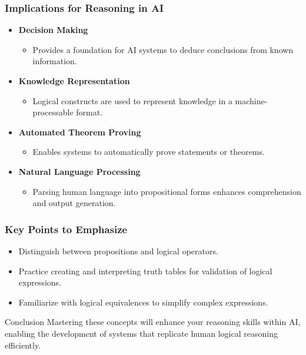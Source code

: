 \documentclass[aspectratio=169]{beamer}
\begin{document}
\begin{frame}[fragile]
    \frametitle{Implications for Reasoning in AI}
    \begin{itemize}
        \item \textbf{Decision Making}
            \begin{itemize}
                \item Provides a foundation for AI systems to deduce conclusions from known information.
            \end{itemize}

        \item \textbf{Knowledge Representation}
            \begin{itemize}
                \item Logical constructs are used to represent knowledge in a machine-processable format.
            \end{itemize}

        \item \textbf{Automated Theorem Proving}
            \begin{itemize}
                \item Enables systems to automatically prove statements or theorems.
            \end{itemize}

        \item \textbf{Natural Language Processing}
            \begin{itemize}
                \item Parsing human language into propositional forms enhances comprehension and output generation.
            \end{itemize}
    \end{itemize}
\end{frame}

\begin{frame}[fragile]
    \frametitle{Key Points to Emphasize}
    \begin{itemize}
        \item Distinguish between propositions and logical operators.
        \item Practice creating and interpreting truth tables for validation of logical expressions.
        \item Familiarize with logical equivalences to simplify complex expressions.
    \end{itemize}

    \begin{block}{Conclusion}
        Mastering these concepts will enhance your reasoning skills within AI, enabling the development of systems that replicate human logical reasoning efficiently.
    \end{block}
\end{frame}
\end{document}
